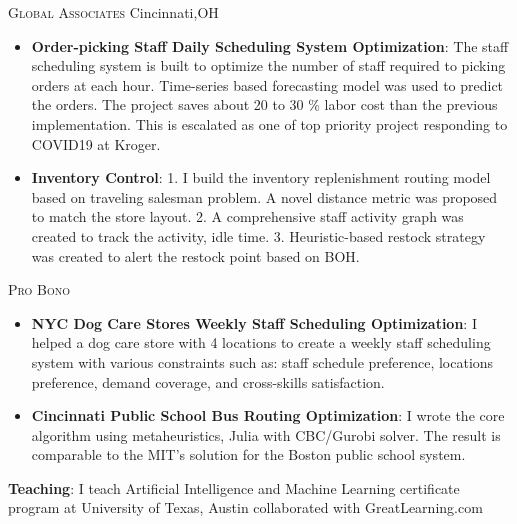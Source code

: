 \documentclass[12pt,letterpaper,roman]{moderncv} %
\begin{document}
\bigskip
{}
{\textsc{Global Associates} }{Cincinnati,OH}{}{}{
\begin{itemize}
\item \textbf{Order-picking Staff Daily Scheduling System Optimization}: 
The staff scheduling system is built to optimize the number of staff required to picking 
orders at each hour. Time-series based forecasting model was used to predict the orders. 
The project saves about  20 to 30 \% labor cost than the previous implementation. 
This is escalated as one of top priority project responding to COVID19 at Kroger.

\item \textbf{Inventory Control}:
1. I build the inventory replenishment routing model based on traveling salesman problem. 
A novel distance metric was proposed to match the store layout. 
2. A comprehensive staff activity graph was created to track the activity, idle time. 
3. Heuristic-based restock strategy was created to alert the restock point based on BOH.


\end{itemize}
}

\bigskip

{\textsc{Pro Bono}}{}{}{}{
\begin{itemize}
\item \textbf{NYC Dog Care Stores Weekly Staff Scheduling Optimization}: I helped a dog 
care store with 4 locations to create a weekly staff scheduling system with various 
constraints such as: staff schedule preference, locations preference, demand coverage, and cross-skills satisfaction. 


\item \textbf{Cincinnati Public School Bus Routing Optimization}: I wrote the core 
 algorithm using metaheuristics, Julia with CBC/Gurobi solver.
  The result is comparable to the MIT's solution for the Boston public school system.
\end{itemize}

\item \textbf{Teaching}:
    I teach Artificial Intelligence and Machine Learning certificate program at University of Texas, Austin collaborated with GreatLearning.com
}







\end{document}
